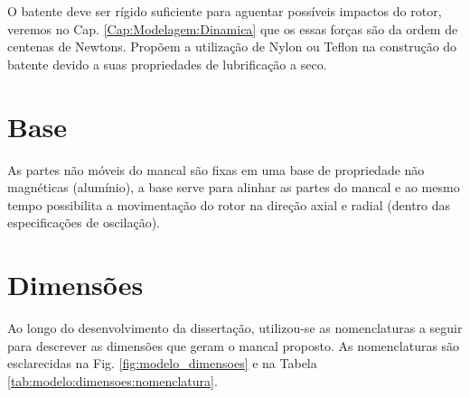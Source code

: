 O batente deve ser rígido suficiente para aguentar possíveis impactos do rotor, veremos no Cap. \ref{Cap:Modelagem:Dinamica} que os essas forças são da ordem de centenas de Newtons. Propõem a utilização de Nylon ou Teflon na construção do batente devido a suas propriedades de lubrificação a seco. 

\section{Base}

As partes não móveis do mancal são fixas em uma base de propriedade não magnéticas (alumínio), a base serve para alinhar as partes do mancal e ao mesmo tempo possibilita a movimentação do rotor na direção axial e radial (dentro das especificações de oscilação). 

%


\section{Dimensões}

Ao longo do desenvolvimento da dissertação, utilizou-se as nomenclaturas a seguir para descrever as dimensões que geram o mancal proposto. As nomenclaturas são esclarecidas na Fig. \ref{fig:modelo_dimensoes} e na Tabela \ref{tab:modelo:dimensoes:nomenclatura}.

